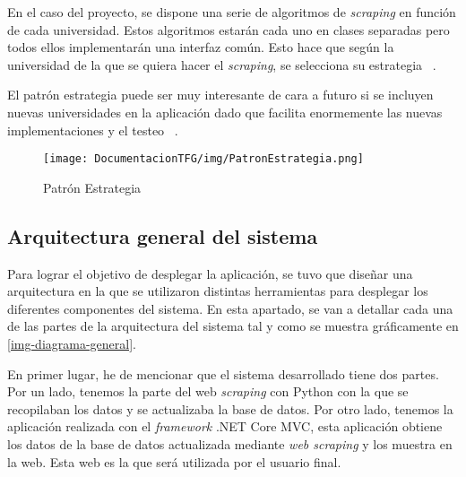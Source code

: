 En el caso del proyecto, se dispone una serie de algoritmos de \textit{scraping} en función de cada universidad. Estos algoritmos estarán cada uno en clases separadas pero todos ellos implementarán una interfaz común. Esto hace que según la universidad de la que se quiera hacer el \textit{scraping}, se selecciona su estrategia ~\cite{patronestrategia:latex}.

El patrón estrategia puede ser muy interesante de cara a futuro si se incluyen nuevas universidades en la aplicación dado que facilita enormemente las nuevas implementaciones y el testeo ~\cite{strategy:latex}.
\begin{figure}[H]
    \centering
    \texttt{[image: DocumentacionTFG/img/PatronEstrategia.png]}
    \caption{Patrón Estrategia} 
\end{figure}

\subsection{Arquitectura general del sistema}
Para lograr el objetivo de desplegar la aplicación, se tuvo que diseñar una arquitectura en la que se utilizaron distintas herramientas para desplegar los diferentes componentes del sistema. En esta apartado, se van a detallar cada una de las partes de la arquitectura del sistema tal y como se muestra gráficamente en \ref{img-diagrama-general}.

En primer lugar, he de mencionar que el sistema desarrollado tiene dos partes. Por un lado, tenemos la parte del web \textit{scraping} con Python con la que se recopilaban los datos y se actualizaba la base de datos. Por otro lado, tenemos la aplicación realizada con el \textit{framework} .NET Core MVC, esta aplicación obtiene los datos de la base de datos actualizada mediante \textit{web scraping} y los muestra en la web. Esta web es la que será utilizada por el usuario final.

